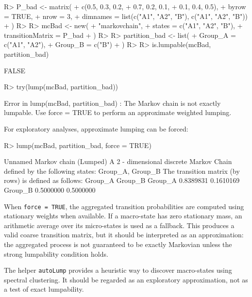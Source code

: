 \documentclass[
  nojss]{jss}
\begin{document}
\begin{CodeChunk}
\begin{CodeInput}
R> P_bad <- matrix(
+   c(0.5, 0.3, 0.2,
+     0.7, 0.2, 0.1,
+     0.1, 0.4, 0.5),
+   byrow = TRUE,
+   nrow = 3,
+   dimnames = list(c("A1", "A2", "B"), c("A1", "A2", "B"))
+ )
R> 
R> mcBad <- new(
+   "markovchain",
+   states = c("A1", "A2", "B"),
+   transitionMatrix = P_bad
+ )
R> 
R> partition_bad <- list(
+   Group_A = c("A1", "A2"),
+   Group_B = c("B")
+ )
R> 
R> is.lumpable(mcBad, partition_bad)
\end{CodeInput}
\begin{CodeOutput}
[1] FALSE
\end{CodeOutput}
\begin{CodeInput}
R> try(lump(mcBad, partition_bad))
\end{CodeInput}
\begin{CodeOutput}
Error in lump(mcBad, partition_bad) : 
  The Markov chain is not exactly lumpable. Use force = TRUE to perform an approximate weighted lumping.
\end{CodeOutput}
\end{CodeChunk}

For exploratory analyses, approximate lumping can be forced:

\begin{CodeChunk}
\begin{CodeInput}
R> lump(mcBad, partition_bad, force = TRUE)
\end{CodeInput}
\begin{CodeOutput}
Unnamed Markov chain (Lumped) 
 A  2 - dimensional discrete Markov Chain defined by the following states: 
 Group_A, Group_B 
 The transition matrix  (by rows)  is defined as follows: 
          Group_A   Group_B
Group_A 0.8389831 0.1610169
Group_B 0.5000000 0.5000000
\end{CodeOutput}
\end{CodeChunk}

When \texttt{force\ =\ TRUE}, the aggregated transition probabilities are computed using
stationary weights when available. If a macro-state has zero stationary mass, an
arithmetic average over its micro-states is used as a fallback. This produces a
valid coarse transition matrix, but it should be interpreted as an approximation:
the aggregated process is not guaranteed to be exactly Markovian unless the
strong lumpability condition holds.

The helper \texttt{autoLump} provides a heuristic way to discover macro-states using
spectral clustering. It should be regarded as an exploratory approximation, not
as a test of exact lumpability.
\end{document}
